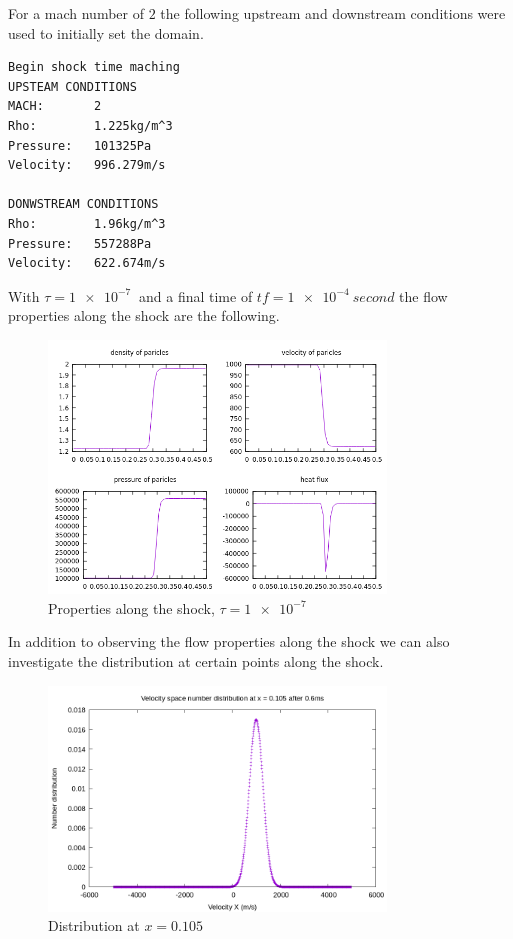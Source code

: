 \documentclass[paper=a4, fontsize=12pt]{scrartcl}
\begin{document}
For a mach number of $2$ the following upstream and downstream conditions were used to initially set the
domain.
\begin{center}
\begin{verbatim}
Begin shock time maching
UPSTEAM CONDITIONS
MACH:       2
Rho:        1.225kg/m^3
Pressure:   101325Pa
Velocity:   996.279m/s

DONWSTREAM CONDITIONS
Rho:        1.96kg/m^3
Pressure:   557288Pa
Velocity:   622.674m/s
\end{verbatim}
\end{center}
With $\tau = \SI{1e-7}{}$ and a final time of $tf = \SI{1e-4}{second}$ the flow properties along the shock are the following.
\begin{figure}[H]
        \centering
        \includegraphics[width=0.8\textwidth]{mach-2-f}
        \caption{Properties along the shock, $\tau = \SI{1e-7}{}$ }
        \label{fig:mach-2-f}
\end{figure}
In addition to observing the flow properties along the shock we can also investigate the distribution
at certain points along the shock.
\begin{figure}[H]
        \centering
        \includegraphics[width=0.8\textwidth]{left_f-m}
        \caption{Distribution at $x=0.105$ }
        \label{fig:left_f-m}
\end{figure}
\end{document}
